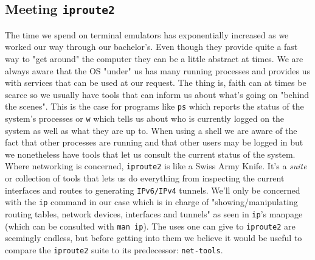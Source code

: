        \subsection{Meeting \texttt{iproute2}}
            The time we spend on terminal emulators has exponentially increased as we worked our way through our bachelor's. Even though they provide quite a fast way to "get around" the computer they can be a little abstract at times. We are always aware that the OS "under" us has many running processes and provides us with services that can be used at our request. The thing is, faith can at times be scarce so we usually have tools that can inform us about what's going on "behind the scenes". This is the case for programs like \texttt{ps} which reports the status of the system's processes or \texttt{w} which tells us about who is currently logged on the system as well as what they are up to. When using a shell we are aware of the fact that other processes are running and that other users may be logged in but we nonetheless have tools that let us consult the current status of the system.\\

            Where networking is concerned, \texttt{iproute2} is like a Swiss Army Knife. It's a \textit{suite} or collection of tools that lets us do everything from inspecting the current interfaces and routes to generating \texttt{IPv6/IPv4} tunnels. We'll only be concerned with the \texttt{ip} command in our case which is in charge of "showing/manipulating routing tables, network devices, interfaces and tunnels" as seen in \texttt{ip}'s manpage (which can be consulted with \texttt{man ip}). The uses one can give to \texttt{iproute2} are seemingly endless, but before getting into them we believe it would be useful to compare the \texttt{iproute2} suite to its predecessor: \texttt{net-tools}.

